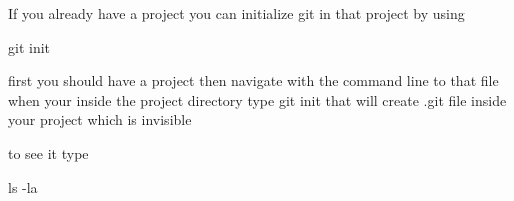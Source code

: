 If you already have a project you can initialize git in that project by using

  git init

first you should have a project 
then navigate with the command line to that file 
when your inside the project directory 
type   git init 
that will create  .git   file inside your project which is invisible 

to see it type 

ls -la   